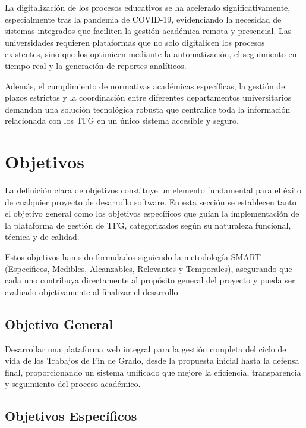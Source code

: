 \documentclass[12pt,a4paper,oneside]{report}
\begin{document}
La digitalización de los procesos educativos se ha acelerado
significativamente, especialmente tras la pandemia de COVID-19,
evidenciando la necesidad de sistemas integrados que faciliten la
gestión académica remota y presencial. Las universidades requieren
plataformas que no solo digitalicen los procesos existentes, sino que
los optimicen mediante la automatización, el seguimiento en tiempo real
y la generación de reportes analíticos.

Además, el cumplimiento de normativas académicas específicas, la gestión
de plazos estrictos y la coordinación entre diferentes departamentos
universitarios demandan una solución tecnológica robusta que centralice
toda la información relacionada con los TFG en un único sistema
accesible y seguro.

\section{Objetivos}\label{objetivos}

La definición clara de objetivos constituye un elemento fundamental para
el éxito de cualquier proyecto de desarrollo software. En esta sección
se establecen tanto el objetivo general como los objetivos específicos
que guían la implementación de la plataforma de gestión de TFG,
categorizados según su naturaleza funcional, técnica y de calidad.

Estos objetivos han sido formulados siguiendo la metodología SMART
(Específicos, Medibles, Alcanzables, Relevantes y Temporales),
asegurando que cada uno contribuya directamente al propósito general del
proyecto y pueda ser evaluado objetivamente al finalizar el desarrollo.

\subsection{Objetivo General}\label{objetivo-general}

Desarrollar una plataforma web integral para la gestión completa del
ciclo de vida de los Trabajos de Fin de Grado, desde la propuesta
inicial hasta la defensa final, proporcionando un sistema unificado que
mejore la eficiencia, transparencia y seguimiento del proceso académico.

\subsection{Objetivos Específicos}\label{objetivos-especuxedficos}
\end{document}
